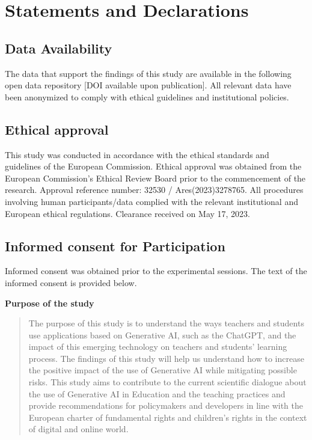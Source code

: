 \documentclass[
  12pt,
]{article}
\begin{document}
\section{Statements and Declarations}\label{statements-and-declarations}

\subsection{Data Availability}\label{data-availability}

The data that support the findings of this study are available in the following open data repository {[}DOI available upon publication{]}. All relevant data have been anonymized to comply with ethical guidelines and institutional policies.

\subsection{Ethical approval}\label{ethical-approval}

This study was conducted in accordance with the ethical standards and guidelines of the European Commission. Ethical approval was obtained from the European Commission's Ethical Review Board prior to the commencement of the research. Approval reference number: 32530 / Ares(2023)3278765. All procedures involving human participants/data complied with the relevant institutional and European ethical regulations. Clearance received on May 17, 2023.

\subsection{Informed consent for Participation}\label{informed-consent-for-participation}

Informed consent was obtained prior to the experimental sessions. The text of the informed consent is provided below.

\textbf{Purpose of the study}

\begin{quote}
The purpose of this study is to understand the ways teachers and students use applications based on Generative AI, such as the ChatGPT, and the impact of this emerging technology on teachers and students' learning process. The findings of this study will help us understand how to increase the positive impact of the use of Generative AI while mitigating possible risks. This study aims to contribute to the current scientific dialogue about the use of Generative AI in Education and the teaching practices and provide recommendations for policymakers and developers in line with the European charter of fundamental rights and children's rights in the context of digital and online world.
\end{quote}
\end{document}
